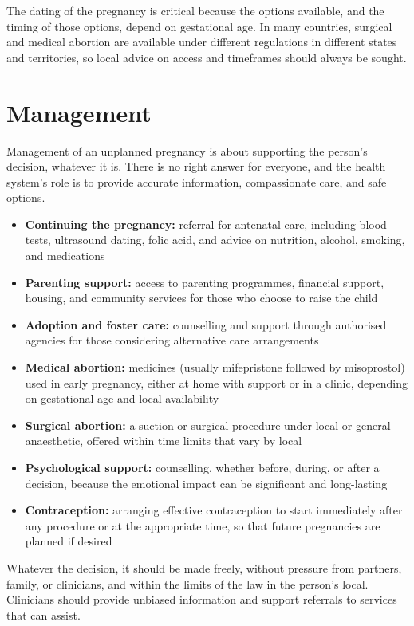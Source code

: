 The dating of the pregnancy is critical because the options available, and the timing of those options, depend on gestational age. In many countries, surgical and medical abortion are available under different regulations in different states and territories, so local advice on access and timeframes should always be sought.

\section*{Management}
Management of an unplanned pregnancy is about supporting the person's decision, whatever it is. There is no right answer for everyone, and the health system's role is to provide accurate information, compassionate care, and safe options.

\begin{itemize}
    \item \textbf{Continuing the pregnancy:} referral for antenatal care, including blood tests, ultrasound dating, folic acid, and advice on nutrition, alcohol, smoking, and medications
    \item \textbf{Parenting support:} access to parenting programmes, financial support, housing, and community services for those who choose to raise the child
    \item \textbf{Adoption and foster care:} counselling and support through authorised agencies for those considering alternative care arrangements
    \item \textbf{Medical abortion:} medicines (usually mifepristone followed by misoprostol) used in early pregnancy, either at home with support or in a clinic, depending on gestational age and local availability
    \item \textbf{Surgical abortion:} a suction or surgical procedure under local or general anaesthetic, offered within time limits that vary by local
    \item \textbf{Psychological support:} counselling, whether before, during, or after a decision, because the emotional impact can be significant and long-lasting
    \item \textbf{Contraception:} arranging effective contraception to start immediately after any procedure or at the appropriate time, so that future pregnancies are planned if desired
\end{itemize}

Whatever the decision, it should be made freely, without pressure from partners, family, or clinicians, and within the limits of the law in the person's local. Clinicians should provide unbiased information and support referrals to services that can assist.

